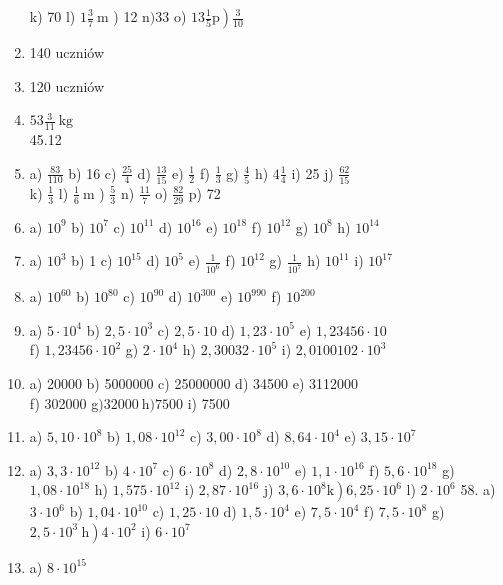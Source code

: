 \documentclass[10pt]{article}
\begin{document}
\begin{enumerate}
k) 70 l) \(1 \frac{3}{7} \mathrm{~m}\) ) 12 n\() 33\) o) \(\left.13 \frac{1}{5} \mathrm{p}\right) \frac{3}{10}\)
  \item 140 uczniów
  \item 120 uczniów
  \item \(53 \frac{3}{11} \mathrm{~kg}\)\\
45.12
  \item a) \(\frac{83}{110}\) b) 16 c) \(\frac{25}{4}\) d) \(\frac{13}{15}\) e) \(\frac{1}{2}\) f) \(\frac{1}{3}\) g) \(\frac{4}{5}\) h) \(4 \frac{1}{4}\) i) 25 j) \(\frac{62}{15}\)\\
k) \(\frac{1}{3}\) l) \(\frac{1}{6} \mathrm{~m}\) ) \(\frac{5}{3}\) n) \(\frac{11}{7}\) o) \(\frac{82}{29}\) p) 72
  \item a) \(10^{9}\) b) \(10^{7}\) c) \(10^{11}\) d) \(10^{16}\) e) \(10^{18}\) f) \(10^{12}\) g) \(10^{8}\) h) \(10^{14}\)
  \item a) \(10^{3}\) b) 1 c) \(10^{15}\) d) \(10^{5}\) e) \(\frac{1}{10^{6}}\) f) \(10^{12}\) g) \(\frac{1}{10^{7}}\) h) \(10^{11}\) i) \(10^{17}\)
  \item a) \(10^{60}\) b) \(10^{80}\) c) \(10^{90}\) d) \(10^{300}\) e) \(10^{990}\) f) \(10^{200}\)
  \item a) \(5 \cdot 10^{4}\) b) \(2,5 \cdot 10^{3}\) c) \(2,5 \cdot 10\) d) \(1,23 \cdot 10^{5}\) e) \(1,23456 \cdot 10\)\\
f) \(1,23456 \cdot 10^{2}\) g) \(2 \cdot 10^{4}\) h) \(2,30032 \cdot 10^{5}\) i) \(2,0100102 \cdot 10^{3}\)
  \item a) 20000 b) 5000000 c) 25000000 d) 34500 e) 3112000\\
f) 302000 g\() 32000 \mathrm{~h}) 7500\) i) 7500
  \item a) \(5,10 \cdot 10^{8}\) b) \(1,08 \cdot 10^{12}\) c) \(3,00 \cdot 10^{8}\) d) \(8,64 \cdot 10^{4}\) e) \(3,15 \cdot 10^{7}\)
  \item a) \(3,3 \cdot 10^{12}\) b) \(4 \cdot 10^{7}\) c) \(6 \cdot 10^{8}\) d) \(2,8 \cdot 10^{10}\) e) \(1,1 \cdot 10^{16}\) f) \(5,6 \cdot 10^{18}\) g) \(1,08 \cdot 10^{18}\) h) \(1,575 \cdot 10^{12}\) i) \(2,87 \cdot 10^{16}\) j) \(\left.3,6 \cdot 10^{8} \mathrm{k}\right) 6,25 \cdot 10^{6}\) l) \(2 \cdot 10^{6}\) 58. a) \(3 \cdot 10^{6}\) b) \(1,04 \cdot 10^{10}\) c) \(1,25 \cdot 10\) d) \(1,5 \cdot 10^{4}\) e) \(7,5 \cdot 10^{4}\) f) \(7,5 \cdot 10^{8}\) g) \(\left.2,5 \cdot 10^{3} \mathrm{~h}\right) 4 \cdot 10^{2}\) i) \(6 \cdot 10^{7}\)
  \item a) \(8 \cdot 10^{15}\)\\

\end{enumerate}
\end{document}
